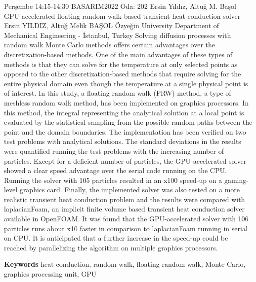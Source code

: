 
    \begin{abstract_basarim}
    {Perşembe 14:15-14:30}
    {BASARIM2022}
    {Oda: 202}
    {Ersin Yıldız, Altuğ M. Başol}
    {GPU-accelerated floating random walk based transient heat conduction solver}
    {%
    Ersin YILDIZ, Altuğ Melik BAŞOL}
    {%
    }
    {%
    Özyeğin University Department of Mechanical Engineering - İstanbul, Turkey}
    Solving diffusion processes with random walk Monte Carlo methods offers certain advantages over the discretization-based methods. One of the main advantages of these types of methods is that they can solve for the temperature at only selected points as opposed to the other discretization-based methods that require solving for the entire physical domain even though the temperature at a single physical point is of interest. In this study, a floating random walk (FRW) method, a type of meshless random walk method, has been implemented on graphics processors. In this method, the integral representing the analytical solution at a local point is evaluated by the statistical sampling from the possible random paths between the point and the domain boundaries. The implementation has been verified on two test problems with analytical solutions. The standard deviations in the results were quantified running the test problems with the increasing number of particles. Except for a deficient number of particles, the GPU-accelerated solver showed a clear speed advantage over the serial code running on the CPU. Running the solver with 105 particles resulted in an x100 speed-up on a gaming-level graphics card. Finally, the implemented solver was also tested on a more realistic transient heat conduction problem and the results were compared with laplacianFoam, an implicit finite volume based transient heat conduction solver available in OpenFOAM. It was found that the GPU-accelerated solver with 106 particles runs about x10 faster in comparison to laplacianFoam running in serial on CPU. It is anticipated that a further increase in the speed-up could be reached by parallelizing the algorithm on multiple graphics processors. 
    
        \textbf{Keywords} \newline{}heat conduction, random walk, floating random walk, Monte Carlo, graphics processing unit, GPU
    \end{abstract_basarim}
    